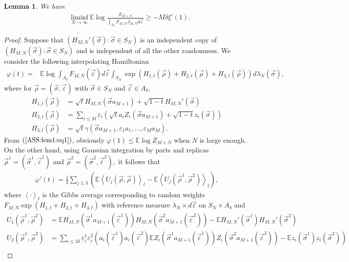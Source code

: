 \documentclass[12pt]{article}
\newcommand{\veps}{\vec{\varepsilon}}
\newcommand{\vsi}{{\vec{\sigma}}}
\newcommand{\vrho}{{\vec{\rho}}}
\newtheorem{lemma}{\bf Lemma}
\newenvironment{Proof of lemma}{\noindent{\bf Proof of Lemma}}{\hfill$\Box$\newline}
\newenvironment{Proof of theorem}{\noindent{\bf Proof of Theorem}}{\hfill{\footnotesize${\square}$}\newline}
\newenvironment{Proof of theorems}{\noindent{\bf Proof of Theorems}}{\hfill$\Box$\newline}
\newenvironment{Proof of proposition}{\noindent{\bf Proof of Proposition}}{\hfill$\Box$\newline}
\newenvironment{Proof of propositions}{\noindent{\bf Proof of Propositions}}{\hfill$\Box$\newline}
\newenvironment{Proof of exercise}{\noindent{\it Proof of Exercise:}}{\hfill$\Box$}
\numberwithin{equation}{section}
\begin{document}
\begin{lemma}\label{ASS:lem2} We have 
\begin{align}
\label{ASS:lem2:eq1}
&\liminf_{N\rightarrow\infty}\mathbb{E}\log \frac{Z_{M+N}}{\int_{A_\delta}F_{M,N}J_{M,N}d\veps}
\geq  -M\delta\xi'(1).
\end{align}
\end{lemma}

\begin{proof}
Suppose that $(H_{M,N}'(\vsi):\vsi\in S_N)$ is an independent copy of $(H_{M,N}(\vsi):\vsi\in S_N)$ and is independent of all the other randomness.
We consider the following interpolating Hamiltonian
\begin{align*}
\varphi(t)=&\mathbb{E}\log\int_{A_\delta}F_{M,N}(\veps)d\veps\int_{S_N}\exp(H_{1,t}(\vrho)+H_{2,t}(\vrho)+H_{3,t}(\vrho))d
\lambda_N(\vsi),
\end{align*}
where for $\vrho=(\vsi,\veps)$ with $\vsi\in S_N$ and $\veps\in A_\delta,$
\begin{align*}
H_{1,t}(\vrho)&=\sqrt{t}H_{M,N}(\vsi a_{M+1})+\sqrt{1-t}H_{M,N}'(\vsi)\\
H_{2,t}(\vrho)&=\sum_{i\leq M}\varepsilon_i\left(\sqrt{t}a_i Z_i(\vsi a_{M+1})+\sqrt{1-t}z_i(\vsi)\right)\\
H_{3,t}(\vrho)&=\sqrt{t}\gamma(\vsi a_{M+1},\varepsilon_1a_1,\ldots,\varepsilon_Ma_M).
\end{align*}
From $(\ref{ASS:lem1:eq1})$, obviously $\varphi(1)\leq\mathbb{E}\log Z_{M+N}$ when $N$ is large enough. On the other hand, using Gaussian integration by parts and replicas $\vrho^1=(\vsi^1,\veps^1)$ and $\vrho^2=(\vsi^2,\veps^2),$ it follows that
\begin{align*}
\varphi'(t)=\frac{1}{2}\sum_{j\leq 3}\left(\mathbb{E}\left<U_{j}(\vrho,\vrho)\right>_t-\mathbb{E}\left<U_j(\vrho^1,\vrho^2)\right>_t\right),
\end{align*}
where $\left<\cdot\right>_t$ is the Gibbs average corresponding to random weights $F_{M,N}\exp(H_{1,t}+H_{2,t}+H_{3,t})$ with reference measure
$\lambda_N\times d\veps$ on $S_N\times A_\delta$ and
\begin{align*}
U_1(\vrho^1,\vrho^2)&=\mathbb{E}H_{M,N}(\vsi^1a_{M+1}(\veps^1))H_{M,N}(\vsi^2a_{M+1}(\veps^2))-
\mathbb{E}H_{M,N}'(\vsi^1)H_{M,N}'(\vsi^2)\\
U_2(\vrho^1,\vrho^2)&=\sum_{i\leq M}\varepsilon_i^1\varepsilon_i^2\left(a_i(\veps^1)a_{i}(\veps^2)\mathbb{E}Z_i(\vsi^1a_{M+1}(\veps^1))Z_i(\vsi^2a_{M+1}(\veps^2))
-\mathbb{E}z_i(\vsi^1)z_i(\vsi^2)\right)\\

\end{align*}
\end{proof}
\end{document}
